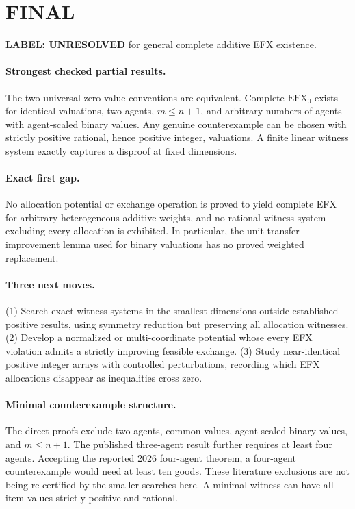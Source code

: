 \documentclass[11pt,a4paper]{article}
\theoremstyle{definition}
\theoremstyle{remark}
\begin{document}
\section{FINAL}
\textbf{LABEL: UNRESOLVED} for general complete additive EFX existence.

\paragraph{Strongest checked partial results.}
The two universal zero-value conventions are equivalent. Complete $\mathrm{EFX}_0$ exists for identical valuations, two agents, $m\leq n+1$, and arbitrary numbers of agents with agent-scaled binary values. Any genuine counterexample can be chosen with strictly positive rational, hence positive integer, valuations. A finite linear witness system exactly captures a disproof at fixed dimensions.

\paragraph{Exact first gap.}
No allocation potential or exchange operation is proved to yield complete EFX for arbitrary heterogeneous additive weights, and no rational witness system excluding every allocation is exhibited. In particular, the unit-transfer improvement lemma used for binary valuations has no proved weighted replacement.

\paragraph{Three next moves.}
(1) Search exact witness systems in the smallest dimensions outside established positive results, using symmetry reduction but preserving all allocation witnesses. (2) Develop a normalized or multi-coordinate potential whose every EFX violation admits a strictly improving feasible exchange. (3) Study near-identical positive integer arrays with controlled perturbations, recording which EFX allocations disappear as inequalities cross zero.

\paragraph{Minimal counterexample structure.}
The direct proofs exclude two agents, common values, agent-scaled binary values, and $m\leq n+1$. The published three-agent result further requires at least four agents. Accepting the reported 2026 four-agent theorem, a four-agent counterexample would need at least ten goods. These literature exclusions are not being re-certified by the smaller searches here. A minimal witness can have all item values strictly positive and rational.
\end{document}
